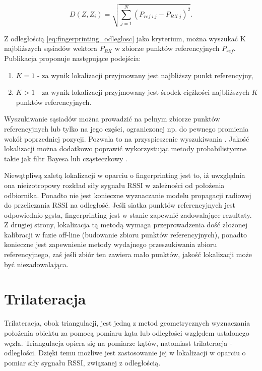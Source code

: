 \begin{equation}
\label{eq:fingerprinting_odleglosc}
 D(Z, Z_i) = \sqrt{\sum_{j=1}^{N} (P_{ref \ i \ j}-P_{RX \ j})^2}.
\end{equation}

Z odległością \ref{eq:fingerprinting_odleglosc} jako kryterium, można wyszukać K najbliższych sąsiadów wektora $P_{RX}$ w zbiorze punktów referencyjnych $P_{ref}$. Publikacja \cite{fingerprinting2} proponuje następujące podejścia:
\begin{enumerate}
 \item $K = 1$ - za wynik lokalizacji przyjmowany jest najbliższy punkt referencyjny,
 \item $K > 1$ - za wynik lokalizacji przyjmowany jest środek ciężkości najbliższych $K$ punktów referencyjnych.
\end{enumerate}

Wyszukiwanie sąsiadów można prowadzić na pełnym zbiorze punktów referencyjnych lub tylko na jego części, ograniczonej np. do pewnego promienia wokół poprzedniej pozycji. Pozwala to na przyspieszenie wyszukiwania \cite{fingerprinting}. Jakość lokalizacji można dodatkowo poprawić wykorzystując metody probabilistyczne takie jak filtr Bayesa lub cząsteczkowy \cite{fingerprinting2}.

Niewątpliwą zaletą lokalizacji w oparciu o fingerprinting jest to, iż uwzględnia ona nieizotropowy rozkład siły sygnału RSSI w zależności od położenia odbiornika. Ponadto nie jest konieczne wyznaczanie modelu propagacji radiowej do przeliczania RSSI na odległość. Jeśli siatka punktów referencyjnych jest odpowiednio gęsta, fingerprinting jest w stanie zapewnić zadowalające rezultaty. Z drugiej strony, lokalizacja tą metodą wymaga przeprowadzenia dość złożonej kalibracji w fazie off-line (budowanie zbioru punktów referencyjnych), ponadto konieczne jest zapewnienie metody wydajnego przeszukiwania zbioru referencyjnego, zaś jeśli zbiór ten zawiera mało punktów, jakość lokalizacji może być niezadowalająca. 


\section{Trilateracja}
\label{sec:trilateracja}
Trilateracja, obok triangulacji, jest jedną z metod geometrycznych wyznaczania położenia obiektu za pomocą pomiaru kąta lub odległości względem ustalonego węzła. Triangulacja opiera się na pomiarze kątów, natomiast trilateracja - odległości. Dzięki temu możliwe jest zastosowanie jej w lokalizacji w oparciu o pomiar siły sygnału RSSI, związanej z odległością. 


